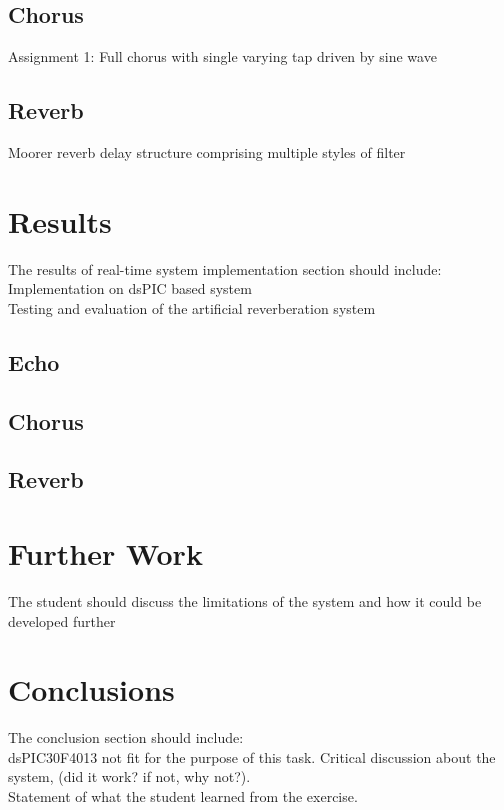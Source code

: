 \documentclass{scrartcl}
\begin{document}
        \subsection{Chorus}
        Assignment 1: Full chorus with single varying tap driven by sine wave
        \subsection{Reverb}
        Moorer reverb delay structure comprising multiple styles of filter
    \section{Results}
    The results of real-time system implementation section should include:\\
        Implementation on dsPIC based system\\
        Testing and evaluation of the artificial reverberation system\\
        \subsection{Echo}
        \subsection{Chorus}
        \subsection{Reverb}
        
    \section{Further Work}
    The student should discuss the limitations of the system and how it could be developed further

    \section{Conclusions}
    The conclusion section should include:\\
    dsPIC30F4013 not fit for the purpose of this task.
        Critical discussion about the system, (did it work? if not, why
        not?).\\
        Statement of what the student learned from the exercise.\\

    \printbibliography
\end{document}
